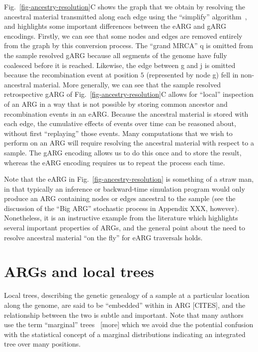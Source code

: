 \documentclass{article}
\newcommand{\noderef}[1]{\textsf{#1}}
\begin{document}
Fig.~\ref{fig-ancestry-resolution}C shows the graph that we obtain
by resolving the ancestral material transmitted along each edge
using the ``simplify'' algorithm~\citep{kelleher2018efficient},
and highlights some important
differences between the eARG and gARG encodings.
Firstly, we can see that some nodes and edges are removed entirely
from the graph by this conversion process.
The ``grand MRCA'' \noderef{q} is omitted from the
sample resolved gARG because all segments of the genome have
fully coalesced before it is reached. Likewise, the edge
between \noderef{g} and \noderef{j} is omitted because the recombination
event at position $5$ (represented by node \noderef{g})
fell in non-ancestral material.
More generally, we can see that the sample resolved
retrospective gARG of Fig.~\ref{fig-ancestry-resolution}C
allows for ``local'' inspection
of an ARG in a way that is not possible by storing
common ancestor and recombination events in an eARG. Because
the ancestral material is stored with each edge, the
cumulative effects of events over time can be reasoned
about, without first ``replaying'' those events. Many computations
that we wish to perform on an ARG will require resolving
the ancestral material with respect to a sample.
The gARG encoding
allows us to do this once and to store the result, whereas
the eARG encoding requires us to repeat the process
each time.

Note that the \citet{wiuf1999recombination} eARG
in Fig.~\ref{fig-ancestry-resolution} is something of a straw man,
in that typically an inference or backward-time simulation program would only produce an
ARG containing
nodes or edges ancestral to the sample
(see the discussion of the ``Big ARG'' stochastic process in Appendix XXX,
however). Nonetheless, it
is an instructive example from the literature which highlights several
important properties of ARGs, and the general point about
the need to resolve ancestral material ``on the fly'' for eARG traversals
holds.

\section*{ARGs and local trees}
Local trees, describing the genetic genealogy of a sample
at a particular location along the genome, are said to be
``embedded'' within in ARG [CITES], and the relationship
between the two is subtle and important.
Note that many authors use the term ``marginal''
trees~\citep[e.g.][]{griffiths1996ancestral,minichiello2006mapping} [more]
which we avoid due the potential confusion with the
statistical concept of a marginal distributions indicating
an integrated tree over many positions.
\end{document}
